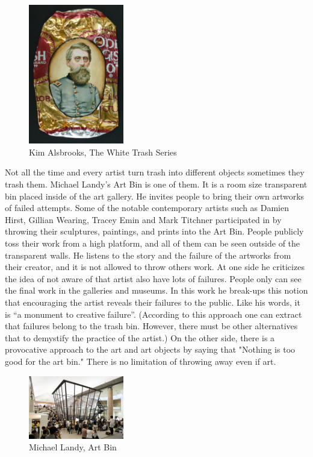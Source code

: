 \begin{figure}
  \begin{center}
    \includegraphics[width=0.37\textwidth]{graphics/Alsbrooks.jpg}
  \end{center}
  \caption{Kim Alsbrooks, The White Trash Series}
  \label{fig:Alsbrooks}
\end{figure}

Not all the time and every artist turn trash into different objects sometimes they trash them. Michael Landy's Art Bin is one of them. It is a room size transparent bin placed inside of the art gallery. He invites people to bring their own artworks of failed attempts. Some of the notable contemporary artists such as Damien Hirst, Gillian Wearing, Tracey Emin and Mark Titchner participated in by throwing their sculptures, paintings, and prints into the Art Bin. People publicly toss their work from a high platform, and all of them can be seen outside of the transparent walls. He listens to the story and the failure of the artworks from their creator, and it is not allowed to throw others work. At one side he criticizes the idea of not aware of that artist also have lots of failures. People only can see the final work in the galleries and museums. In this work he break-ups this notion that encouraging the artist reveals their failures to the public. Like his words, it is “a monument to creative failure”. (According to this approach one can extract that failures belong to the trash bin. However, there must be other alternatives that to demystify the practice of the artist.) On the other side, there is a provocative approach to the art and art objects by saying that "Nothing is too good for the art bin." There is no limitation of throwing away even if art. 

\begin{figure}[h!]
  \centering
  \includegraphics[width=0.37\textwidth]{graphics/MichaelLandy_ArtBin.jpg}
  \caption{Michael Landy, Art Bin}
  \label{fig:MichaelLandy_ArtBin}
\end{figure}

